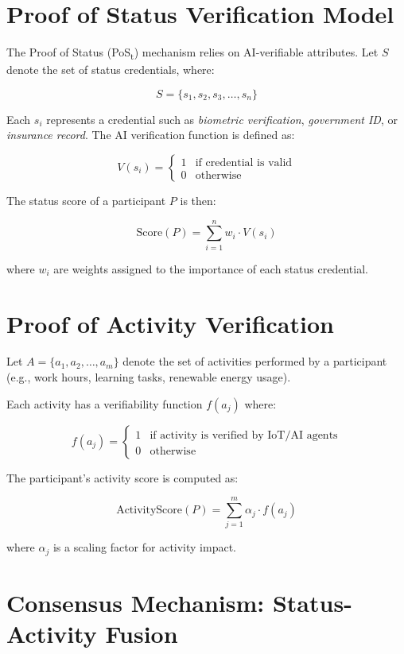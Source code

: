 \documentclass[11pt,a4paper]{article}
\begin{document}
\section{Proof of Status Verification Model}

The Proof of Status (PoS\textsubscript{t}) mechanism relies on AI-verifiable attributes. 
Let $S$ denote the set of status credentials, where:

\[
S = \{ s_1, s_2, s_3, \dots, s_n \}
\]

Each $s_i$ represents a credential such as \textit{biometric verification}, 
\textit{government ID}, or \textit{insurance record}.  
The AI verification function is defined as:

\[
V(s_i) = 
\begin{cases} 
1 & \text{if credential is valid} \\
0 & \text{otherwise}
\end{cases}
\]

The status score of a participant $P$ is then:

\[
\text{Score}(P) = \sum_{i=1}^{n} w_i \cdot V(s_i)
\]

where $w_i$ are weights assigned to the importance of each status credential.

\section{Proof of Activity Verification}

Let $A = \{ a_1, a_2, \dots, a_m \}$ denote the set of activities performed 
by a participant (e.g., work hours, learning tasks, renewable energy usage).  

Each activity has a verifiability function $f(a_j)$ where:

\[
f(a_j) =
\begin{cases}
1 & \text{if activity is verified by IoT/AI agents} \\
0 & \text{otherwise}
\end{cases}
\]

The participant's activity score is computed as:

\[
\text{ActivityScore}(P) = \sum_{j=1}^{m} \alpha_j \cdot f(a_j)
\]

where $\alpha_j$ is a scaling factor for activity impact.

\section{Consensus Mechanism: Status-Activity Fusion}
\end{document}
